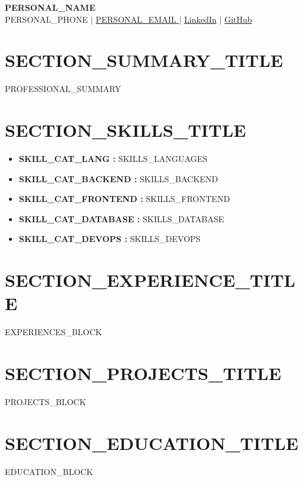 \documentclass[10pt,a4paper]{article}
\begin{document}
\begin{center}
    {\Huge \bfseries {{ PERSONAL_NAME }}}\\[3pt]
    \small {{ PERSONAL_PHONE }} $|$ \href{mailto:{{ PERSONAL_EMAIL }}}{{{ PERSONAL_EMAIL }}} $|$ \href{{{ PERSONAL_LINKEDIN }}}{LinkedIn} $|$ \href{{{ PERSONAL_GITHUB }}}{GitHub}\\[2pt]
\end{center}

\vspace{-6pt}

\section*{{{ SECTION_SUMMARY_TITLE }}}
\small {{ PROFESSIONAL_SUMMARY }}

\section*{{{ SECTION_SKILLS_TITLE }}}
\begin{itemize}
    \item \small \textbf{{{ SKILL_CAT_LANG }}:} {{ SKILLS_LANGUAGES }}
    \item \small \textbf{{{ SKILL_CAT_BACKEND }}:} {{ SKILLS_BACKEND }}
    \item \small \textbf{{{ SKILL_CAT_FRONTEND }}:} {{ SKILLS_FRONTEND }}
    \item \small \textbf{{{ SKILL_CAT_DATABASE }}:} {{ SKILLS_DATABASE }}
    \item \small \textbf{{{ SKILL_CAT_DEVOPS }}:} {{ SKILLS_DEVOPS }}
\end{itemize}

\section*{{{ SECTION_EXPERIENCE_TITLE }}}
{{ EXPERIENCES_BLOCK }}

\section*{{{ SECTION_PROJECTS_TITLE }}}
{{ PROJECTS_BLOCK }}

\section*{{{ SECTION_EDUCATION_TITLE }}}
\begin{itemize}
{{ EDUCATION_BLOCK }}
\end{itemize}
\end{document}
